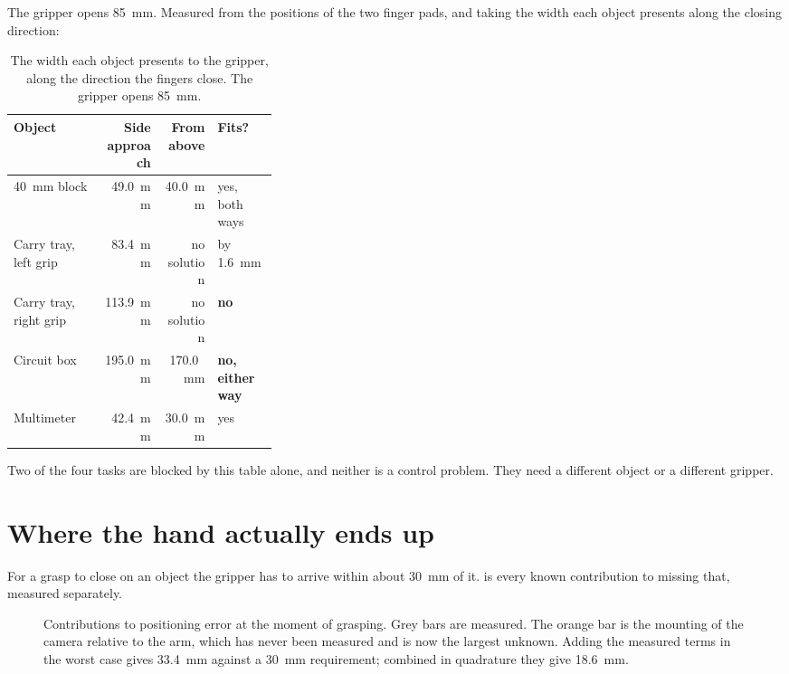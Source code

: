 The gripper opens \SI{85}{\milli\metre}. Measured from the positions of the
two finger pads, and taking the width each object presents along the closing
direction:

\begin{table}[htbp]
  \centering
  \small
  \caption[What fits in the hand]{The width each object presents to the
  gripper, along the direction the fingers close. The gripper opens
  \SI{85}{\milli\metre}.}
  \label{tab:grip}
  \begin{tabular}{@{}p{0.34\linewidth}rrl@{}}
    \toprule
    \textbf{Object} & \textbf{Side approach} & \textbf{From above} &
    \textbf{Fits?} \\
    \midrule
    \SI{40}{\milli\metre} block & \SI{49.0}{\milli\metre} &
      \SI{40.0}{\milli\metre} & yes, both ways \\
    Carry tray, left grip & \SI{83.4}{\milli\metre} & no solution & by
      \SI{1.6}{\milli\metre} \\
    Carry tray, right grip & \SI{113.9}{\milli\metre} & no solution &
      \textbf{no} \\
    Circuit box & \SI{195.0}{\milli\metre} & \SI{170.0}{\milli\metre} &
      \textbf{no, either way} \\
    Multimeter & \SI{42.4}{\milli\metre} & \SI{30.0}{\milli\metre} & yes \\
    \bottomrule
  \end{tabular}
\end{table}

Two of the four tasks are blocked by this table alone, and neither is a
control problem. They need a different object or a different gripper.

\section{Where the hand actually ends up}

For a grasp to close on an object the gripper has to arrive within about
\SI{30}{\milli\metre} of it.  is every known contribution to
missing that, measured separately.

\begin{figure}[htbp]
  \centering
  
  \caption[The error budget]{Contributions to positioning error at the moment
  of grasping. Grey bars are measured. The orange bar is the mounting of the
  camera relative to the arm, which has never been measured and is now the
  largest unknown. Adding the measured terms in the worst case gives
  \SI{33.4}{\milli\metre} against a \SI{30}{\milli\metre} requirement; combined
  in quadrature they give \SI{18.6}{\milli\metre}.}
  \label{fig:budget}
\end{figure}

